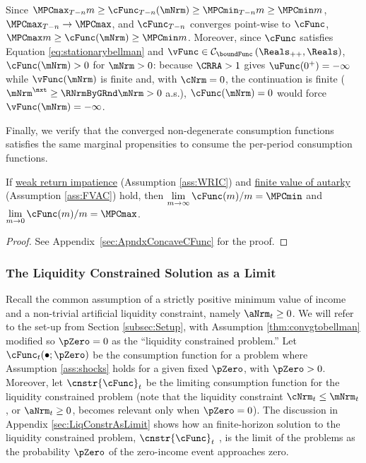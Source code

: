 \documentclass[\econtexRoot/BufferStockTheory]{subfiles}
\begin{document}
\begin{remark}\label{remark:cStatStrctPos}
Since $\MPCmax_{T-n} m \geq \cFunc_{T-n}(\mNrm)\geq \MPCmin_{T-n} m\geq \MPCmin m$, $\MPCmax_{T-n}\rightarrow\MPCmax$, and $\cFunc_{T-n}$ converges point-wise to $\cFunc$, $\MPCmax m \geq \cFunc(\mNrm)\geq \MPCmin m$. Moreover, since $\cFunc$ satisfies Equation \eqref{eq:stationarybellman} and $\vFunc \in \mathcal{C}_{\boundFunc }\left(\Reals_{++},\Reals\right)$, $\cFunc(\mNrm)>0$ for $\mNrm>0$: because $\CRRA>1$ gives $\uFunc(0^{+})=-\infty$ while $\vFunc(\mNrm)$ is finite and, with $\cNrm=0$, the continuation is finite ($\mNrm^{\nxt}\geq\RNrmByGRnd\mNrm>0$ a.s.), $\cFunc(\mNrm)=0$ would force $\vFunc(\mNrm)=-\infty$.
\end{remark}

Finally, we verify that the converged non-degenerate consumption functions satisfies the same marginal propensities to consume the per-period consumption functions.

\begin{lemma}\label{lemma:MPCBoundsConvg}
If \hyperlink{WRIC}{weak return impatience} (Assumption \ref{ass:WRIC}) and \hyperlink{FVAC}{finite value of autarky} (Assumption \ref{ass:FVAC}) hold, then $\lim\limits_{m\rightarrow \infty} \cFunc (m)/m =\MPCmin$ and $\lim\limits_{m\rightarrow 0} \cFunc (m)/m =\MPCmax$.

\end{lemma}
\begin{proof}\let\qed\relax
See Appendix~\ref{sec:ApndxConcaveCFunc} for the proof.

\end{proof}


\hypertarget{The-Liquidity-Constrained-Solution-as-a-Limit}{}
\subsubsection{The Liquidity Constrained Solution as a Limit}\label{subsubsec:deatonIsLimit}

Recall the common assumption \citep{deatonLiqConstr,aiyagari:ge, lsIncFluct, mstIncFluct} of a strictly positive minimum value of income and a non-trivial artificial liquidity constraint, namely $\aNrm_{t}\geq 0$.
We will refer to the set-up from Section \ref{subsec:Setup}, with Assumption \ref{thm:convgtobellman} modified so $\pZero=0$ as the ``liquidity constrained problem.'' Let $\cFunc_{t}(\bullet;\pZero)$ be the consumption function for a problem where Assumption \ref{ass:shocks} holds for a given fixed $\pZero$, with $\pZero>0$.
Moreover, let $\cnstr{\cFunc}_{t}$ be the limiting consumption function for the liquidity constrained problem (note that the liquidity constraint $\cNrm_{t}\leq \mNrm_{t}$, or $\aNrm_{t}\geq 0$, becomes relevant only when $\pZero= 0$).
The discussion in Appendix \ref{sec:LiqConstrAsLimit} shows how an finite-horizon solution to the liquidity constrained problem, $\cnstr{\cFunc}_{t}$ , is the limit of the problems as the probability $\pZero$ of the zero-income event approaches zero.
\end{document}
